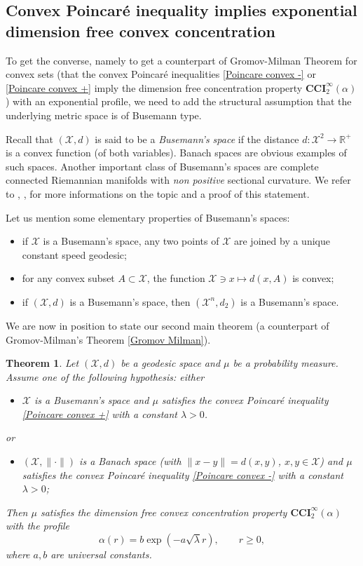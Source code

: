 \documentclass[11pt]{amsart}
\newtheorem{thm}[equation]{Theorem}
\numberwithin{equation}{section}
\begin{document}
\subsection{Convex Poincar\'e inequality implies exponential dimension free convex concentration}To get the converse, namely to get a counterpart of Gromov-Milman Theorem for convex sets (that the convex Poincar\'e inequalities \eqref{Poincare convex -} or \eqref{Poincare convex +} imply the dimension free concentration property $\mathbf{CCI}_2^\infty(\alpha)$) with an exponential profile, we need to add the structural assumption that the underlying metric space is of Busemann type.

Recall that $({\mathcal{X}},d)$ is said to be a \emph{Busemann's space} if the distance  $d:{\mathcal{X}}^2\to{\mathbb{R}}^+$ is a convex function (of both variables). 
Banach spaces are obvious examples of such spaces. Another important class of Busemann's spaces are complete connected Riemannian manifolds with \emph{non positive} sectional curvature. We refer to \cite{BBI01}, \cite{BH99}, \cite{P05} for more informations on the topic and a proof of this statement.

Let us mention some elementary properties of Busemann's spaces: 
\begin{itemize}
\item[(B1)] if ${\mathcal{X}}$ is a Busemann's space, any two points of ${\mathcal{X}}$ are joined by a unique constant speed geodesic; 
\item[(B2)] for any convex subset $A\subset {\mathcal{X}}$, the function ${\mathcal{X}} \ni x \mapsto d(x,A)$ is convex;
\item[(B3)] if $({\mathcal{X}},d)$ is a Busemann's space, then $({\mathcal{X}}^n,d_2)$ is a Busemann's space.
\end{itemize}

We are now in position to state our second main theorem (a counterpart of Gromov-Milman's Theorem \ref{Gromov Milman}). 

\begin{thm}\label{Gromov Milman convex} 
Let $({\mathcal{X}},d)$ be a geodesic space and $\mu$ be a probability measure.
Assume one of the following hypothesis:
either
\begin{itemize}
\item[(a)] 
${\mathcal{X}}$ is a Busemann's space 
and $\mu$ satisfies the convex Poincar\'e inequality \eqref{Poincare convex +} with a constant $\lambda>0$.
\end{itemize}
or
\begin{itemize}
\item[(b)] 
$({\mathcal{X}},\|\cdot\|)$  is a Banach space (with $\|x-y\|=d(x,y)$, $x,y \in {\mathcal{X}}$) and 
$\mu$ satisfies the convex Poincar\'e inequality \eqref{Poincare convex -} with a constant $\lambda>0$;
\end{itemize}
Then $\mu$ satisfies the dimension free convex concentration property $\mathbf{CCI}_2^\infty(\alpha)$ with the profile 
\[
\alpha(r)=b\exp(-a\sqrt{\lambda}r),\qquad r\geq0,
\]
where $a,b$ are universal constants.
\end{thm}
\end{document}

